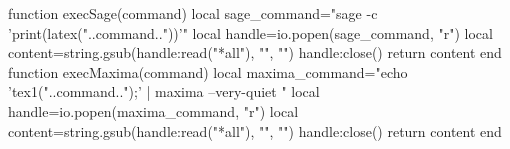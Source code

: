 \documentclass[a4paper]{ltjsarticle}
\begin{document}

\begin{luacode*}
function execSage(command)
  local sage_command="sage -c 'print(latex("..command.."))'"
  local handle=io.popen(sage_command, "r")
  local content=string.gsub(handle:read("*all"), "\n", "")
  handle:close()
  return content
end
function execMaxima(command)
  local maxima_command="echo 'tex1("..command..");' | maxima --very-quiet "
  local handle=io.popen(maxima_command, "r")
  local content=string.gsub(handle:read("*all"), "\n", "")
  handle:close()
  return content
end
\end{luacode*}

\end{document}
